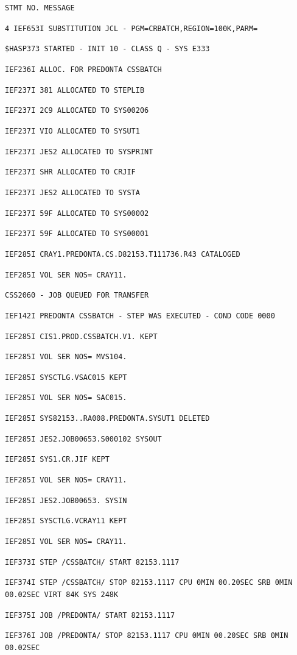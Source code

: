 
\texttt{STMT NO. MESSAGE}

\texttt{4 IEF653I SUBSTITUTION JCL - PGM=CRBATCH,REGION=100K,PARM=}

\texttt{\$HASP373 STARTED - INIT 10 - CLASS Q - SYS E333}

\texttt{IEF236I ALLOC. FOR PREDONTA CSSBATCH}

\texttt{IEF237I 381 ALLOCATED TO STEPLIB}

\texttt{IEF237I 2C9 ALLOCATED TO SYS00206}

\texttt{IEF237I VIO ALLOCATED TO SYSUT1}

\texttt{IEF237I JES2 ALLOCATED TO SYSPRINT}

\texttt{IEF237I SHR ALLOCATED TO CRJIF}

\texttt{IEF237I JES2 ALLOCATED TO SYSTA}

\texttt{IEF237I 59F ALLOCATED TO SYS00002}

\texttt{IEF237I 59F ALLOCATED TO SYS00001}

\texttt{IEF285I CRAY1.PREDONTA.CS.D82153.T111736.R43 CATALOGED}

\texttt{IEF285I VOL SER NOS= CRAY11.}

\texttt{CSS2060 - JOB QUEUED FOR TRANSFER}

\texttt{IEF142I PREDONTA CSSBATCH - STEP WAS EXECUTED - COND CODE 0000}

\texttt{IEF285I CIS1.PROD.CSSBATCH.V1. KEPT}

\texttt{IEF285I VOL SER NOS= MVS104.}

\texttt{IEF285I SYSCTLG.VSAC015 KEPT}

\texttt{IEF285I VOL SER NOS= SAC015.}

\texttt{IEF285I SYS82153..RA008.PREDONTA.SYSUT1 DELETED}

\texttt{IEF285I JES2.JOB00653.S000102 SYSOUT}

\texttt{IEF285I SYS1.CR.JIF KEPT}

\texttt{IEF285I VOL SER NOS= CRAY11.}

\texttt{IEF285I JES2.JOB00653. SYSIN}

\texttt{IEF285I SYSCTLG.VCRAY11 KEPT}

\texttt{IEF285I VOL SER NOS= CRAY11.}

\texttt{IEF373I STEP /CSSBATCH/ START 82153.1117}

\texttt{IEF374I STEP /CSSBATCH/ STOP 82153.1117 CPU 0MIN 00.20SEC SRB 0MIN 00.02SEC VIRT 84K SYS 248K}

\texttt{IEF375I JOB /PREDONTA/ START 82153.1117}

\texttt{IEF376I JOB /PREDONTA/ STOP 82153.1117 CPU 0MIN 00.20SEC SRB 0MIN 00.02SEC}
